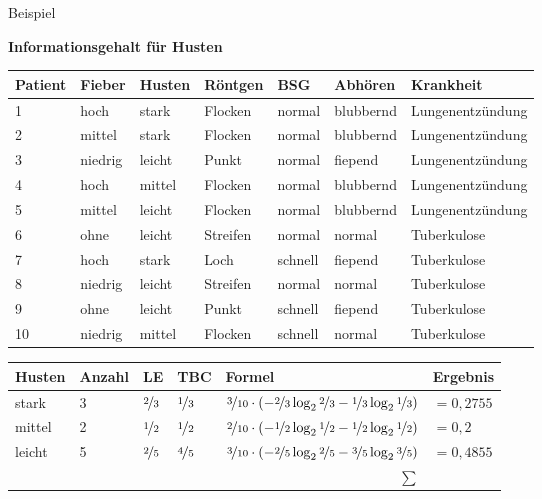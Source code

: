 \begin{frame}{Beispiel}

\textbf{Informationsgehalt für Husten} \\[1em]

\begin{tabular}{|l l l l l l | l |}\hline
\textbf{Patient} & \textbf{\textcolor{ohmred}{Fieber}} & \textbf{\textcolor{ohmred}{Husten}} & \textbf{\textcolor{ohmred}{Röntgen}} & \textbf{\textcolor{ohmred}{BSG}} & \textbf{\textcolor{ohmred}{Abhören}} &\textbf{\textcolor{ohmgreen}{Krankheit}}\\ \hline
1 & hoch & stark & Flocken & normal & blubbernd & Lungenentzündung \\
2 & mittel & stark & Flocken & normal & blubbernd & Lungenentzündung \\
3 & niedrig & leicht & Punkt & normal & fiepend & Lungenentzündung \\
4 & hoch & mittel & Flocken & normal & blubbernd & Lungenentzündung \\
5 & mittel & leicht & Flocken & normal & blubbernd & Lungenentzündung \\
6 & ohne & leicht & Streifen & normal & normal & Tuberkulose \\
7 & hoch & stark & Loch & schnell & fiepend & Tuberkulose \\
8 & niedrig & leicht & Streifen & normal & normal & Tuberkulose \\
9 & ohne & leicht & Punkt & schnell & fiepend & Tuberkulose \\
10 & niedrig & mittel & Flocken & schnell & normal & Tuberkulose \\ \hline 
\end{tabular}

\vfill

\begin{tabular}{| l<{\onslide<2->} | l<{\onslide<3->} | l<{\onslide<5->} | l<{\onslide<6->} | l<{\onslide<7->} | l<{\onslide} |}\hline 
\textbf{\textcolor{ohmred}{Husten}} & \textbf{Anzahl} & \textbf{LE} & \textbf{TBC} & \textbf{Formel} & \textbf{Ergebnis} \\ \hline  
stark & 3 & $ \nicefrac{2}{3}$ & $ \nicefrac{1}{3}$ & $ \nicefrac{3}{10} \cdot \left(- \nicefrac{2}{3} \log_2 \nicefrac{2}{3} - \nicefrac{1}{3} \log_2 \nicefrac{1}{3} \right)$ & $=0{,}2755$ \\ \hline 
mittel & 2 & $ \nicefrac{1}{2}$ & $\nicefrac{1}{2}$ & $ \nicefrac{2}{10} \cdot \left(- \nicefrac{1}{2} \log_2 \nicefrac{1}{2} - \nicefrac{1}{2} \log_2 \nicefrac{1}{2} \right)$ & $=0{,}2$  \\ \hline 
leicht & 5 & $\nicefrac{2}{5}$ & $\nicefrac{4}{5}$ & $\nicefrac{3}{10} \cdot \left(- \nicefrac{2}{5} \log_2 \nicefrac{2}{5} - \nicefrac{3}{5} \log_2 \nicefrac{3}{5} \right)$ & $=0{,}4855$  \\ \hline  
\multicolumn{5}{r|}{$\boldsymbol{\sum}$} & \onslide<8->{$0{,}9610$} \\ \cline{6-6}
\end{tabular}

\end{frame}


